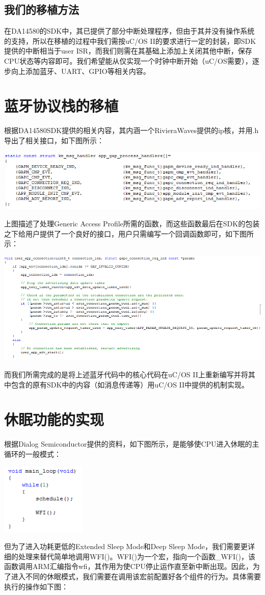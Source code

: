 \documentclass{ctexart}
\begin{document}
\subsection{我们的移植方法}
在DA14580的SDK中，其已提供了部分中断处理程序，但由于其并没有操作系统的支持，所以在移植的过程中我们需按uC/OS II的要求进行一定的封装，即SDK提供的中断相当于user ISR，而我们则需在其基础上添加上关闭其他中断，保存CPU状态等内容即可。我们希望能从仅实现一个时钟中断开始（uC/OS需要），逐步向上添加蓝牙、UART、GPIO等相关内容。
\section{蓝牙协议栈的移植}
根据DA14580SDK提供的相关内容，其内涵一个RivieraWaves提供的ip核，并用.h导出了相关接口，如下图所示：

\centerline{\includegraphics[scale=0.65]{012}}\par
上图描述了处理Generic Access Profile所需的函数，而这些函数最后在SDK的包装之下给用户提供了一个良好的接口，用户只需编写一个回调函数即可，如下图所示：

\centerline{\includegraphics[scale=0.5]{013}}\par
而我们所需完成的是将上述蓝牙代码中的核心代码在uC/OS II上重新编写并将其中包含的原有SDK中的内容（如消息传递等）用uC/OS II中提供的机制实现。
\section{休眠功能的实现}
根据Dialog Semiconductor提供的资料，如下图所示，是能够使CPU进入休眠的主循环的一般模式：

\centerline{\includegraphics[scale=0.65]{014}}\par
但为了进入功耗更低的Extended Sleep Mode和Deep Sleep Mode，我们需要更详细的处理来替代简单地调用WFI()。WFI()为一个宏，指向一个函数\_WFI()，该函数调用ARM汇编指令wfi，其作用为使CPU停止运作直至新中断出现。因此，为了进入不同的休眠模式，我们需要在调用该宏前配置好各个组件的行为。具体需要执行的操作如下图：
\end{document}
